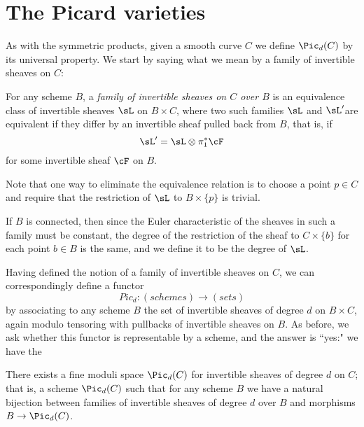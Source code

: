  



\section{The Picard varieties}

As with the symmetric products, given a smooth curve $C$ we define $\Pic_d(C)$ by its universal property. We start by saying what we mean by a family of invertible sheaves on $C$:

\begin{definition}
 For any scheme $B$, a \emph{family of invertible sheaves on $C$ over $B$} is an equivalence class of invertible sheaves $\sL$ on $B\times C$, where two such
 families $\sL$ and $\sL'$are equivalent if they differ by an invertible sheaf pulled back from $B$, that is, if
 $$
 \sL' = \sL \otimes \pi_1^*\cF
 $$
for some invertible sheaf $\cF$ on $B$.
 \end{definition}

Note that one way to eliminate the equivalence relation is to choose a point $p \in C$ and require that the restriction of $\sL$ to $B \times \{p\}$ is trivial.
 
 
 If $B$ is connected, then since the Euler characteristic of the sheaves in such a family must be constant, the degree of the restriction of 
 the sheaf to $C\times \{b\}$ for each point $b\in B$ is the same, and we define it to be the degree of $\sL$. 
 
 Having defined the notion of a family of invertible sheaves on $C$, we can correspondingly define a functor
 $$
 Pic_d : (schemes) \to (sets)
 $$
 by associating to any scheme $B$ the set of invertible sheaves of degree $d$ on $B \times C$, again modulo tensoring with pullbacks of invertible sheaves on $B$. As before, we ask whether this functor is representable by a scheme, and the answer is ``yes:" we have the
 
 \begin{fact}
 There exists a fine moduli space $\Pic_d(C)$ for invertible sheaves of degree $d$ on $C$; that is, a scheme $\Pic_d(C)$ such that for any scheme $B$ we have a natural bijection between families of invertible sheaves of degree $d$ over $B$ and morphisms $B \to \Pic_d(C)$.
 \end{fact}
 
